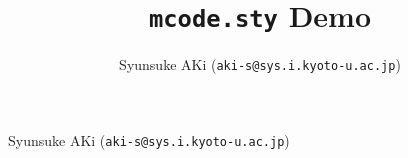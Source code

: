 \documentclass{article}
\title{\texttt{mcode.sty} Demo}
\author{Syunsuke AKi (\texttt{aki-s@sys.i.kyoto-u.ac.jp})}
\begin{document}


\medskip


Syunsuke AKi (\texttt{aki-s@sys.i.kyoto-u.ac.jp})
\end{document}
